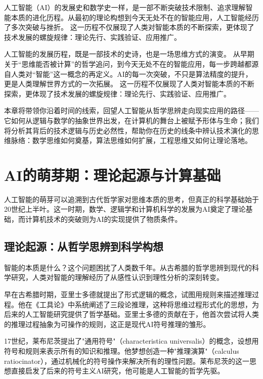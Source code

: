 
人工智能（AI）的发展史和数学史一样，是一部不断突破技术限制、追求理解智能本质的进化历程。从最初的理论构想到今天无处不在的智能应用，人工智能经历了多次突破与挫折。 这一历程不仅展现了人类对智能本质的不断探索，更体现了技术发展的螺旋规律：理论先行、实践验证、应用推广。

人工智能的发展历程，既是一部技术的史诗，也是一场思维方式的演变。  
从早期关于“思维能否被计算”的哲学追问，到今天无处不在的智能应用，每一步跨越都源自人类对“智能”这一概念的再定义。AI的每一次突破，不只是算法精度的提升，更是人类理解世界方式的一次拓展。 
 这一历程不仅展现了人类对智能本质的不断探索，更体现了技术发展的螺旋规律：理论先行、实践验证、应用推广。  

本章将带领你沿着时间的线索，回望人工智能从哲学思辨走向现实应用的路径——它如何从逻辑与数学的抽象世界出发，在计算机的舞台上被赋予形体与生命；我们将分析其背后的技术逻辑与历史必然性，帮助你在历史的线条中辨认技术演化的思维脉络：数学思维如何奠基，算法思维如何扩展，工程思维又如何让理论落地。

\section{AI的萌芽期：理论起源与计算基础}

人工智能的萌芽可以追溯到古代哲学家对思维本质的思考，但真正的科学基础始于20世纪上半叶。这一时期，数学、逻辑学和计算机科学的发展为AI奠定了理论基础，而计算机技术的突破则为AI的实现提供了物质条件。

\subsection{理论起源：从哲学思辨到科学构想}

智能的本质是什么？这个问题困扰了人类数千年。从古希腊的哲学思辨到现代的科学研究，人类对智能的理解经历了从感性认识到理性分析的深刻转变。

早在古希腊时期，亚里士多德就提出了形式逻辑的概念，试图用规则来描述推理过程。他在《工具论》中系统阐述了三段论推理，这种将思维过程形式化的思想，为后来的人工智能研究提供了哲学基础。亚里士多德的贡献在于，他首次尝试将人类的推理过程抽象为可操作的规则，这正是现代AI符号推理的雏形。

17世纪，莱布尼茨提出了"通用符号"（characteristica universalis）的概念，设想用符号和规则来表示所有的知识和推理。他梦想创造一种"推理演算"（calculus ratiocinator），通过机械化的符号操作来解决所有的理性问题。莱布尼茨的这一思想直接启发了后来的符号主义AI研究，他可能是人工智能的哲学先驱。

